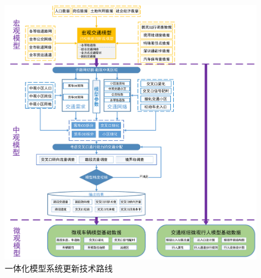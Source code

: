 \begin{figure}[ht]
  \centering
  \includegraphics[width=\textwidth]{figures/chp01_一体化模型系统更新技术路线.pdf}
  \caption{一体化模型系统更新技术路线\label{fig:一体化模型系统更新技术路线} }
\end{figure}















